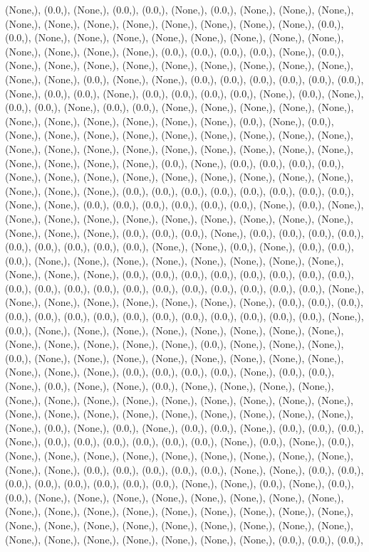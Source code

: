 \documentclass{article}
\begin{document}
(None,), (0.0,), (None,), (0.0,), (0.0,), (None,), (0.0,), (None,), (None,), (None,), (None,), (None,), (None,), (None,), (None,), (None,), (None,), (None,), (0.0,), (0.0,), (None,), (None,), (None,), (None,), (None,), (None,), (None,), (None,), (None,), (None,), (None,), (None,), (0.0,), (0.0,), (0.0,), (0.0,), (None,), (0.0,), (None,), (None,), (None,), (None,), (None,), (None,), (None,), (None,), (None,), (None,), (None,), (0.0,), (None,), (None,), (0.0,), (0.0,), (0.0,), (0.0,), (0.0,), (0.0,), (None,), (0.0,), (0.0,), (None,), (0.0,), (0.0,), (0.0,), (0.0,), (None,), (0.0,), (None,), (0.0,), (0.0,), (None,), (0.0,), (0.0,), (None,), (None,), (None,), (None,), (None,), (None,), (None,), (None,), (None,), (None,), (None,), (0.0,), (None,), (0.0,), (None,), (None,), (None,), (None,), (None,), (None,), (None,), (None,), (None,), (None,), (None,), (None,), (None,), (None,), (None,), (None,), (None,), (None,), (None,), (None,), (None,), (None,), (0.0,), (None,), (0.0,), (0.0,), (0.0,), (0.0,), (None,), (None,), (None,), (None,), (None,), (None,), (None,), (None,), (None,), (None,), (None,), (None,), (0.0,), (0.0,), (0.0,), (0.0,), (0.0,), (0.0,), (0.0,), (0.0,), (None,), (None,), (0.0,), (0.0,), (0.0,), (0.0,), (0.0,), (0.0,), (None,), (0.0,), (None,), (None,), (None,), (None,), (None,), (None,), (None,), (None,), (None,), (None,), (None,), (None,), (None,), (0.0,), (0.0,), (0.0,), (None,), (0.0,), (0.0,), (0.0,), (0.0,), (0.0,), (0.0,), (0.0,), (0.0,), (0.0,), (None,), (None,), (0.0,), (None,), (0.0,), (0.0,), (0.0,), (None,), (None,), (None,), (None,), (None,), (None,), (None,), (None,), (None,), (None,), (None,), (0.0,), (0.0,), (0.0,), (0.0,), (0.0,), (0.0,), (0.0,), (0.0,), (0.0,), (0.0,), (0.0,), (0.0,), (0.0,), (0.0,), (0.0,), (0.0,), (0.0,), (0.0,), (0.0,), (None,), (None,), (None,), (None,), (None,), (None,), (None,), (None,), (0.0,), (0.0,), (0.0,), (0.0,), (0.0,), (0.0,), (0.0,), (0.0,), (0.0,), (0.0,), (0.0,), (0.0,), (0.0,), (0.0,), (None,), (0.0,), (None,), (None,), (None,), (None,), (None,), (None,), (None,), (None,), (None,), (None,), (None,), (None,), (None,), (0.0,), (None,), (None,), (None,), (0.0,), (None,), (None,), (None,), (None,), (None,), (None,), (None,), (None,), (None,), (None,), (None,), (0.0,), (0.0,), (0.0,), (0.0,), (None,), (0.0,), (0.0,), (None,), (0.0,), (None,), (None,), (0.0,), (None,), (None,), (None,), (None,), (None,), (None,), (None,), (None,), (None,), (None,), (None,), (None,), (None,), (None,), (None,), (None,), (None,), (None,), (None,), (None,), (None,), (None,), (None,), (0.0,), (None,), (0.0,), (None,), (0.0,), (0.0,), (None,), (0.0,), (0.0,), (0.0,), (None,), (0.0,), (0.0,), (0.0,), (0.0,), (0.0,), (0.0,), (None,), (0.0,), (None,), (0.0,), (None,), (None,), (None,), (None,), (None,), (None,), (None,), (None,), (None,), (None,), (None,), (0.0,), (0.0,), (0.0,), (0.0,), (0.0,), (None,), (None,), (0.0,), (0.0,), (0.0,), (0.0,), (0.0,), (0.0,), (0.0,), (0.0,), (None,), (None,), (0.0,), (None,), (0.0,), (0.0,), (None,), (None,), (None,), (None,), (None,), (None,), (None,), (None,), (None,), (None,), (None,), (None,), (None,), (None,), (None,), (None,), (None,), (None,), (None,), (None,), (None,), (None,), (None,), (None,), (None,), (None,), (None,), (None,), (None,), (None,), (None,), (None,), (None,), (0.0,), (0.0,), (0.0,), 
\end{document}
